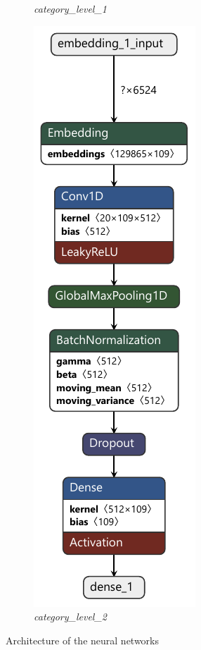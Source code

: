 \begin{figure}[htpb]
\begin{subfigure}{0.47\linewidth}
		\caption{\textit{category\_level\_1}}
	\end{subfigure}
	\begin{subfigure}{0.47\linewidth}
		\centering
		\includegraphics[height=0.9\textheight]{Images/model_level_2.keras.pdf}
		\caption{\textit{category\_level\_2}}
	\end{subfigure}
	\caption{Architecture of the neural networks}
	\label{fig:nn_architectures}
\end{figure}
 


